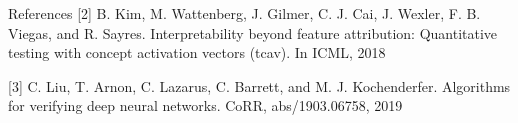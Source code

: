 \documentclass[final]{beamer}
\begin{document}
\begin{frame}[fragile]{}
\begin{textblock}{\colwidth}
\begin{paddedBlock}{References}
\footnotesize{[2] B. Kim, M. Wattenberg, J. Gilmer, C. J. Cai, J. Wexler, F. B. Viegas, and R. Sayres. Interpretability beyond feature attribution: Quantitative testing with concept activation vectors (tcav). In ICML, 2018}


\footnotesize{[3] C. Liu, T. Arnon, C. Lazarus, C. Barrett, and M. J. Kochenderfer. Algorithms for verifying deep neural networks. CoRR, abs/1903.06758, 2019}

\end{paddedBlock}
\end{textblock}






\end{frame}
\end{document}
